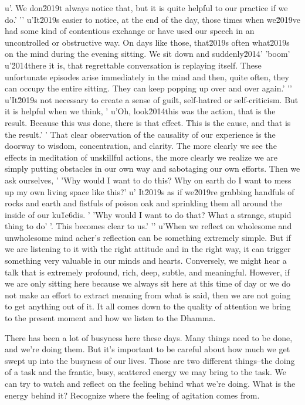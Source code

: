 u'. We don\u2019t always notice that, but it is quite helpful to our practice if we do.'
'\n'
u'It\u2019s easier to notice, at the end of the day, those times when we\u2019ve had some kind of contentious exchange or have used our speech in an uncontrolled or obstructive way. On days like those, that\u2019s often what\u2019s on the mind during the evening sitting. We sit down and suddenly\u2014'
'boom'
u'\u2014there it is, that regrettable conversation is replaying itself. These unfortunate episodes arise immediately in the mind and then, quite often, they can occupy the entire sitting. They can keep popping up over and over again.'
'\n'
u'It\u2019s not necessary to create a sense of guilt, self-hatred or self-criticism. But it is helpful when we think, '
u'Oh, look\u2014this was the action, that is the result. Because this was done, there is that effect. This is the cause, and that is the result.'
' That clear observation of the causality of our experience is the doorway to wisdom, concentration, and clarity. The more clearly we see the effects in meditation of unskillful actions, the more clearly we realize we are simply putting obstacles in our own way and sabotaging our own efforts. Then we ask ourselves, '
'Why would I want to do this? Why on earth do I want to mess up my own living space like this?'
u' It\u2019s as if we\u2019re grabbing handfuls of rocks and earth and fistfuls of poison oak and sprinkling them all around the inside of our ku\u1e6dis. '
'Why would I want to do that? What a strange, stupid thing to do'
'. This becomes clear to us.'
'\n'
u'When we reflect on wholesome and unwholesome mind acher's 
reflection can be something extremely simple. But if we are listening 
to it with the right attitude and in the right way, it can trigger 
something very valuable in our minds and hearts. Conversely, we might 
hear a talk that is extremely profound, rich, deep, subtle, and 
meaningful. However, if we are only sitting here because we always sit 
here at this time of day or we do not make an effort to extract meaning 
from what is said, then we are not going to get anything out of it. It 
all comes down to the quality of attention we bring to the present 
moment and how we listen to the Dhamma.


There has been a lot of busyness here these days. Many things need to 
be done, and we're doing them. But it's important to be careful about 
how much we get swept up into the busyness of our lives. Those are two 
different things–the doing of a task and the frantic, busy, scattered 
energy we may bring to the task. We can try to watch and reflect on the 
feeling behind what we're doing. What is the energy behind it? 
Recognize where the feeling of agitation comes from.


